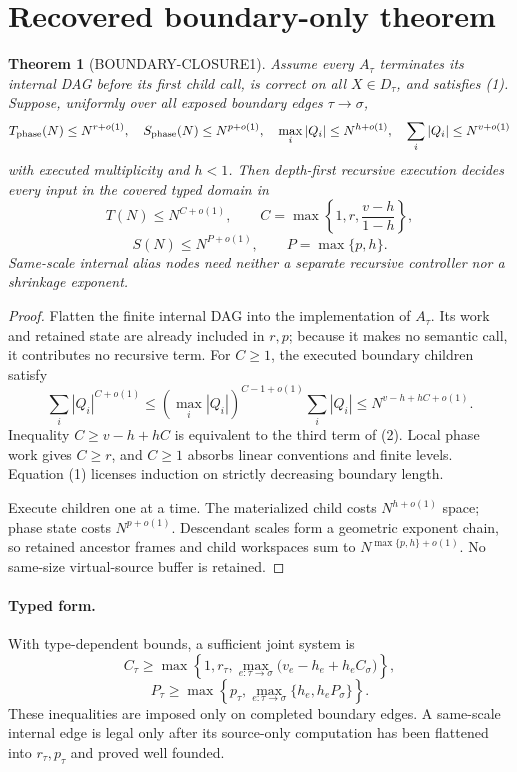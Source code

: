 \documentclass[11pt]{article}
\newtheorem{theorem}{Theorem}
\begin{document}
\section{Recovered boundary-only theorem}
\begin{theorem}[BOUNDARY-CLOSURE1]\label{thm:closure}
Assume every $A_\tau$ terminates its internal DAG before its first child call,
is correct on all $X\in D_\tau$, and satisfies (1).  Suppose, uniformly over
all exposed boundary edges $\tau\to\sigma$,
\[
 T_{\rm phase}(N)\le N^{r+o(1)},\quad
 S_{\rm phase}(N)\le N^{p+o(1)},\quad
 \max_i |Q_i|\le N^{h+o(1)},\quad
 \sum_i|Q_i|\le N^{v+o(1)}
\]
with executed multiplicity and $h<1$.  Then depth-first
recursive execution decides every input in the covered typed domain in
\[
 T(N)\le N^{C+o(1)},\qquad
 C=\max\left\{1,r,\frac{v-h}{1-h}\right\},                \tag{2}
\]
\[
 S(N)\le N^{P+o(1)},\qquad P=\max\{p,h\}.                \tag{3}
\]
Same-scale internal alias nodes need neither a separate recursive controller
nor a shrinkage exponent.
\end{theorem}
\begin{proof}
Flatten the finite internal DAG into the implementation of $A_\tau$.  Its
work and retained state are already included in $r,p$; because it makes no
semantic call, it contributes no recursive term.  For $C\ge1$, the executed
boundary children satisfy
\[
 \sum_i |Q_i|^{C+o(1)}
 \le \left(\max_i|Q_i|\right)^{C-1+o(1)}
      \sum_i|Q_i|
 \le N^{v-h+hC+o(1)}.
\]
Inequality $C\ge v-h+hC$ is equivalent to the third term of (2).  Local phase work
gives $C\ge r$, and $C\ge1$ absorbs linear conventions and finite levels.
Equation (1) licenses induction on strictly decreasing boundary length.

Execute children one at a time.  The materialized child costs
$N^{h+o(1)}$ space; phase state costs $N^{p+o(1)}$.  Descendant scales form a
geometric exponent chain, so retained ancestor frames and child workspaces
sum to $N^{\max\{p,h\}+o(1)}$.  No same-size virtual-source buffer is retained.
\end{proof}

\paragraph{Typed form.}
With type-dependent bounds, a sufficient joint system is
\[
 C_\tau\ge
 \max\!\left\{1,r_\tau,
 \max_{e:\tau\to\sigma}
   \bigl(v_e-h_e+h_eC_\sigma\bigr)\right\},
\]
\[
 P_\tau\ge
 \max\!\left\{p_\tau,
 \max_{e:\tau\to\sigma}\{h_e,h_eP_\sigma\}\right\}.
\]
These inequalities are imposed only on completed boundary edges.  A
same-scale internal edge is legal only after its source-only computation has
been flattened into $r_\tau,p_\tau$ and proved well founded.
\end{document}
